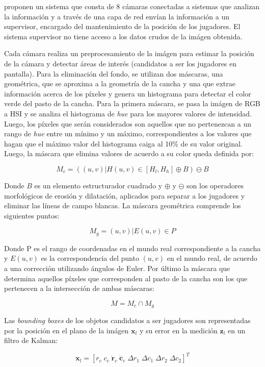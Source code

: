 \documentclass[a4paper,10pt]{article}
\begin{document}
\citeauthor*{xu-8cams} proponen un sistema que consta de 8 cámaras conectadas a sistemas que 
analizan la información y a través de una capa de red envían la información a un supervisor,
encargado del mantenimiento de la posición de los jugadores. El sistema supervisor no tiene 
acceso a los datos crudos de la imágen obtenida.

Cada cámara realiza un preprocesamiento de la imágen para estimar la posición de la cámara y
detectar áreas de interés (candidatos a ser los jugadores en pantalla). Para la eliminación
del fondo, se utilizan dos máscaras, una geométrica, que se aproxima a la geometría de la
cancha y una que extrae información acerca de los píxeles y genera un histograma para
detectar el color verde del pasto de la cancha. Para la primera máscara, se pasa la imágen de
RGB a HSI y se analiza el histograma de \textit{hue} para los mayores valores de intensidad.
Luego, los píxeles que serán considerados son aquellos que no pertenezcan a un rango de \textit{hue}
entre un mínimo y un máximo, correspondientes a los valores que hagan que el máximo valor
del histograma caiga al 10\% de su valor original.  Luego, la máscara que elimina valores
de acuerdo a su color queda definida por:

\[
  M_c = ({(u, v) | H(u, v) \in [H_l, H_h]} \oplus B ) \ominus B
\]

Donde $B$ es un elemento estructurador cuadrado y $\oplus$ y $\ominus$ son los operadores
morfológicos de erosión y dilatación, aplicados para separar a los jugadores y eliminar las
líneas de campo blancas. La máscara geométrica comprende los siguientes puntos:

\[
  M_g = { (u, v) | E(u, v)  \in P }
\]

Donde P es el rango de coordenadas en el mundo real correspondiente a la cancha y $E(u, v)$ es 
la correspondencia del punto $(u, v)$ en el mundo real, de acuerdo a una corrección utilizando
ángulos de Euler. Por último la máscara que determina aquellos píxeles que corresponden al
pasto de la cancha son los que pertenecen a la intersección de ambas máscaras:

\[
  M = M_c \cap M_g
\]

Las \textit{bounding boxes} de los objetos candidatos a ser jugadores son representadas por
la posición en el plano de la imágen $\mathbf{x}_l$ y su error en la medición $\mathbf{z}_l$ en
un filtro de Kalman:

\[
\mathbf{x}_l = [r_c \; c_c \;  \mathbf{\dot r}_c  \; \mathbf{\dot c}_c \;  \Delta r_1  \; \Delta c_1 \;  \Delta r_2 \;  \Delta c_2]^T
\]
\end{document}
